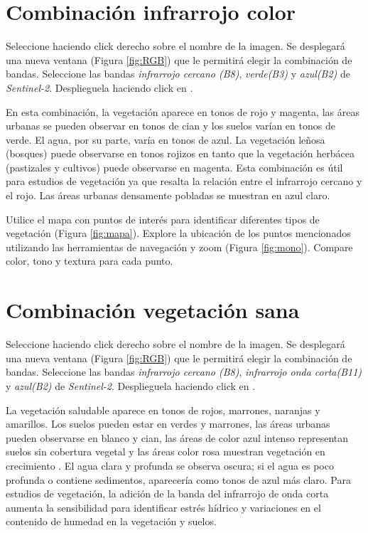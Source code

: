 \section{Combinación infrarrojo color}
\label{sec:infrarrojocolor}

Seleccione  haciendo click derecho sobre el nombre de la imagen. Se desplegará una nueva ventana (Figura \ref{fig:RGB}) que le permitirá elegir la combinación de bandas. Seleccione las bandas \emph{infrarrojo cercano (B8)}, \emph{verde(B3)} y \emph{azul(B2)} de \emph{Sentinel-2}. Desplieguela haciendo click en .

En esta combinación, la vegetación aparece en tonos de rojo y magenta, las áreas urbanas se pueden observar en tonos de cian y los suelos varían en tonos de verde. El agua, por su parte, varía en tonos de azul. La vegetación leñosa (bosques) puede observarse en tonos rojizos en tanto que la vegetación herbácea (pastizales y cultivos) puede observarse en magenta. Esta combinación es útil para estudios de vegetación ya que resalta la relación entre el infrarrojo cercano y el rojo. Las áreas urbanas densamente pobladas se muestran en azul claro.

Utilice el mapa con puntos de interés para identificar diferentes tipos de vegetación (Figura \ref{fig:mapa}). Explore la ubicación de los puntos mencionados utilizando las herramientas de navegación y zoom  (Figura \ref{fig:mono}). Compare color, tono y textura para cada punto.

\section{Combinación vegetación sana}
\label{sec:vegetacionsana}

Seleccione  haciendo click derecho sobre el nombre de la imagen. Se desplegará una nueva ventana (Figura \ref{fig:RGB}) que le permitirá elegir la combinación de bandas. Seleccione las bandas \emph{infrarrojo cercano (B8)}, \emph{infrarrojo onda corta(B11)} y \emph{azul(B2)} de \emph{Sentinel-2}. Desplieguela haciendo click en .

La vegetación saludable aparece en tonos de rojos, marrones, naranjas y amarillos. Los suelos pueden estar en verdes y marrones, las áreas urbanas pueden observarse en blanco y cian, las áreas de color azul intenso representan suelos sin cobertura vegetal y las áreas color rosa muestran vegetación en crecimiento . El agua clara y profunda se observa oscura; si el agua es poco profunda o contiene sedimentos, aparecería como tonos de azul más claro. Para estudios de vegetación, la adición de la banda del infrarrojo de onda corta aumenta la sensibilidad para identificar estrés hídrico y variaciones en el contenido de humedad en la vegetación y suelos.

